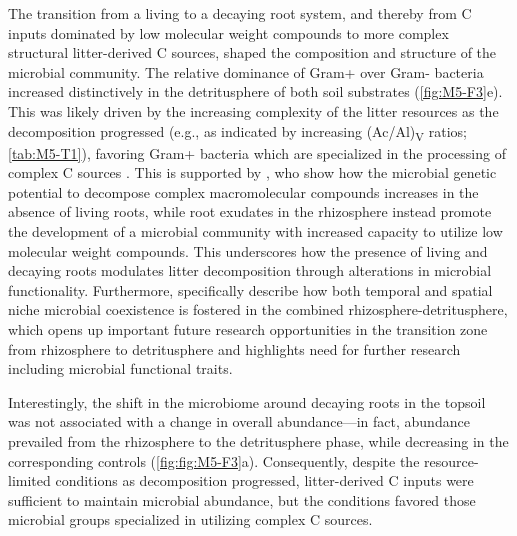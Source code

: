 The transition from a living to a decaying root system, and thereby from C inputs dominated by low molecular weight compounds to more complex structural litter-derived C sources, shaped the composition and structure of the microbial community. The relative dominance of Gram+ over Gram- bacteria increased distinctively in the detritusphere of both soil substrates (\ref{fig:M5-F3}e). This was likely driven by the increasing complexity of the litter resources as the decomposition progressed (e.g., as indicated by increasing (Ac/Al)\textsubscript{V} ratios; \ref{tab:M5-T1}), favoring Gram+ bacteria which are specialized in the processing of complex C sources \citep{Fanin2019, Denef2009, Butler2003}. This is supported by \citet{Shi2018}, who show how the microbial genetic potential to decompose complex macromolecular compounds increases in the absence of living roots, while root exudates in the rhizosphere instead promote the development of a microbial community with increased capacity to utilize low molecular weight compounds. This underscores how the presence of living and decaying roots modulates litter decomposition through alterations in microbial functionality. Furthermore, \citet{Nuccio2020} specifically describe how both temporal and spatial niche microbial coexistence is fostered in the combined rhizosphere-detritusphere, which opens up important future research opportunities in the transition zone from rhizosphere to detritusphere and highlights need for further research including microbial functional traits.

Interestingly, the shift in the microbiome around decaying roots in the topsoil was not associated with a change in overall abundance---in fact, abundance prevailed from the rhizosphere to the detritusphere phase, while decreasing in the corresponding controls (\ref{fig:fig:M5-F3}a). Consequently, despite the resource-limited conditions as decomposition progressed, litter-derived C inputs were sufficient to maintain microbial abundance, but the conditions favored those microbial groups specialized in utilizing complex C sources.


